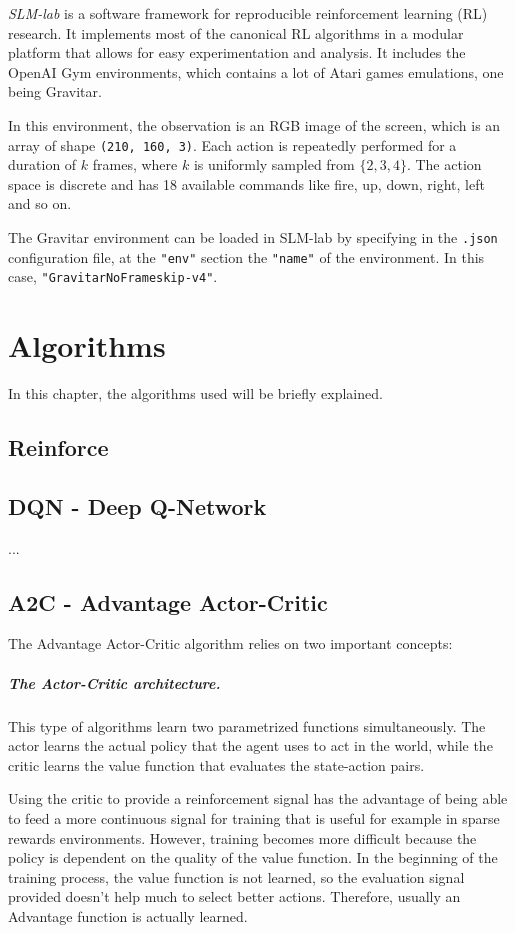\documentclass[12pt,a4paper]{report}
\begin{document}
		\emph{SLM-lab} \cite{kenggraesser2017slmlab} is a software framework for reproducible reinforcement learning (RL) research. It implements most of the canonical RL algorithms in a modular platform that allows for easy experimentation and analysis. It includes the OpenAI Gym \cite{brockman2016openai} environments, which contains a lot of Atari games emulations, one being Gravitar.
		
		In this environment, the observation is an RGB image of the screen, which is an array of shape \lstinline|(210, 160, 3)|. Each action is repeatedly performed for a duration of $k$ frames, where $k$ is uniformly sampled from $\{2, 3, 4\}$. The action space is discrete and has 18 available commands like fire, up, down, right, left and so on.
		
		The Gravitar environment can be loaded in SLM-lab by specifying in the \lstinline|.json| configuration file, at the \lstinline|"env"| section the \lstinline|"name"| of the environment. In this case, \lstinline|"GravitarNoFrameskip-v4"|. 
		
	\chapter{Algorithms}
		In this chapter, the algorithms used will be briefly explained.
		\section{Reinforce}
		\section{DQN - Deep Q-Network}
		...
		\section{A2C - Advantage Actor-Critic}
		The Advantage Actor-Critic algorithm relies on two important concepts:
			\paragraph{The Actor-Critic architecture.} This type of algorithms learn two parametrized functions simultaneously. The actor learns the actual policy that the agent uses to act in the world, while the critic learns the value function that evaluates the state-action pairs.
			
			Using the critic to provide a reinforcement signal has the advantage of being able to feed a more continuous signal for training that is useful for example in sparse rewards environments. However, training becomes more difficult because the policy is dependent on the quality of the value function. In the beginning of the training process, the value function is not learned, so the evaluation signal provided doesn't help much to select better actions. Therefore, usually an Advantage function is actually learned.
\end{document}
